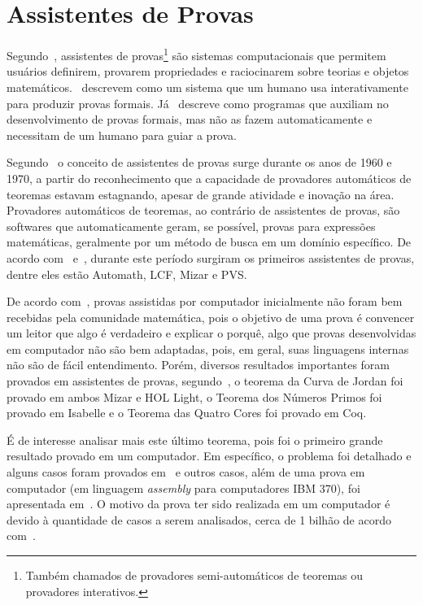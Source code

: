 \chapter{Assistentes de Provas}
	\label{cap:AssistentesProvas}
	Segundo~, assistentes de provas\footnote{Também chamados de provadores semi-automáticos de teoremas ou provadores interativos.}
	são sistemas computacionais que permitem usuários definirem, provarem propriedades e
	raciocinarem sobre teorias e objetos matemáticos.~ descrevem como um sistema que um humano usa interativamente para produzir
	provas formais. Já~ descreve como programas que auxiliam no desenvolvimento de provas formais, mas não as fazem automaticamente e
	necessitam de um humano para guiar a prova.

	Segundo~ o conceito de assistentes de provas surge durante os anos de 1960 e 1970, a partir do reconhecimento que a capacidade de provadores
	automáticos de teoremas estavam estagnando, apesar de grande atividade e inovação na área. Provadores automáticos de teoremas, ao contrário de assistentes de provas,
	são softwares que automaticamente geram, se possível, provas para expressões matemáticas, geralmente por um método de busca em um domínio específico.
	De acordo com~ e~, durante este período surgiram os primeiros assistentes de provas, dentre eles estão Automath, LCF, Mizar e PVS.

	De acordo com~, provas assistidas por computador inicialmente não foram bem recebidas pela comunidade matemática, pois o objetivo de uma prova é
	convencer um leitor que algo é verdadeiro e explicar o porquê, algo que provas desenvolvidas em computador não são bem adaptadas, pois, em geral,
	suas linguagens internas não são de fácil entendimento. Porém, diversos resultados importantes foram provados em assistentes de provas, segundo~,
	o teorema da Curva de Jordan foi provado em ambos Mizar e HOL Light, o Teorema dos Números Primos foi provado em Isabelle e o Teorema das Quatro Cores foi provado em Coq.

	É de interesse analisar mais este último teorema, pois foi o primeiro grande resultado provado em um computador. Em específico, o problema foi detalhado e alguns casos foram provados
	em~ e outros casos, além de uma prova em computador (em linguagem \textit{assembly} para computadores IBM 370), foi apresentada em~.
	O motivo da prova ter sido realizada em um computador é devido à quantidade de casos a serem analisados, cerca de 1 bilhão de acordo com~.

